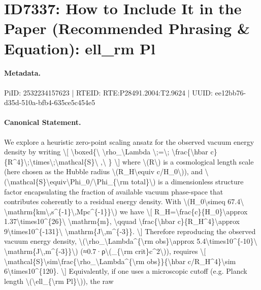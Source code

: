 \section*{ID7337: How to Include It in the Paper (Recommended Phrasing \& Equation): ell\_rm Pl}
\paragraph{Metadata.}
PiID: 2532234157623 | RTEID: RTE:P28491.2004:T2.9624 | UUID: ee12bb76-d35d-510a-bfb4-635ce5c454e5

\paragraph{Canonical Statement.}
We explore a heuristic zero-point scaling ansatz for the observed vacuum energy density by writing \textbackslash{}[ \textbackslash{}boxed\{\textbackslash{} \textbackslash{}rho\_\textbackslash{}Lambda \textbackslash{};=\textbackslash{}; \textbackslash{}frac\{\textbackslash{}hbar c\}\{R\textasciicircum{}4\}\textbackslash{};\textbackslash{}times\textbackslash{};\textbackslash{}mathcal\{S\}\textbackslash{} ,\textbackslash{} \} \textbackslash{}] where \textbackslash{}(R\textbackslash{}) is a cosmological length scale (here chosen as the Hubble radius \textbackslash{}(R\_H\textbackslash{}equiv c/H\_0\textbackslash{})), and \textbackslash{}(\textbackslash{}mathcal\{S\}\textbackslash{}equiv\textbackslash{}Phi\_0/\textbackslash{}Phi\_\{\textbackslash{}rm total\}\textbackslash{}) is a dimensionless structure factor encapsulating the fraction of available vacuum phase-space that contributes coherently to a residual energy density. With \textbackslash{}(H\_0\textbackslash{}simeq 67.4\textbackslash{} \textbackslash{}mathrm\{km\textbackslash{},s\textasciicircum{}\{-1\}\textbackslash{},Mpc\textasciicircum{}\{-1\}\}\textbackslash{}) we have \textbackslash{}[ R\_H=\textbackslash{}frac\{c\}\{H\_0\}\textbackslash{}approx 1.37\textbackslash{}times10\textasciicircum{}\{26\}\textbackslash{} \textbackslash{}mathrm\{m\}, \textbackslash{}qquad \textbackslash{}frac\{\textbackslash{}hbar c\}\{R\_H\textasciicircum{}4\}\textbackslash{}approx 9\textbackslash{}times10\textasciicircum{}\{-131\}\textbackslash{} \textbackslash{}mathrm\{J\textbackslash{},m\textasciicircum{}\{-3\}\}. \textbackslash{}] Therefore reproducing the observed vacuum energy density, \textbackslash{}(\textbackslash{}rho\_\textbackslash{}Lambda\textasciicircum{}\{\textbackslash{}rm obs\}\textbackslash{}approx 5.4\textbackslash{}times10\textasciicircum{}\{-10\}\textbackslash{} \textbackslash{}mathrm\{J\textbackslash{},m\textasciicircum{}\{-3\}\}\textbackslash{}) (≈0.7·ρ\textbackslash{}(\_\{\textbackslash{}rm crit\}c\textasciicircum{}2\textbackslash{})), requires \textbackslash{}[ \textbackslash{}mathcal\{S\}\textbackslash{}sim\textbackslash{}frac\{\textbackslash{}rho\_\textbackslash{}Lambda\textasciicircum{}\{\textbackslash{}rm obs\}\}\{\textbackslash{}hbar c/R\_H\textasciicircum{}4\}\textbackslash{}sim 6\textbackslash{}times10\textasciicircum{}\{120\}. \textbackslash{}] Equivalently, if one uses a microscopic cutoff (e.g. Planck length \textbackslash{}(\textbackslash{}ell\_\{\textbackslash{}rm Pl\}\textbackslash{})), the raw 